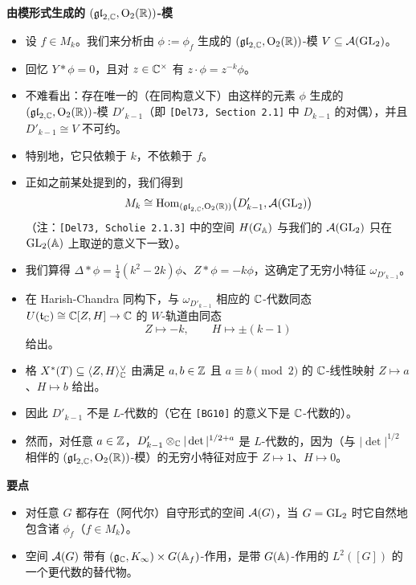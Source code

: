 \medskip
\noindent\textbf{由模形式生成的 $(\mathfrak{gl}_{2,\mathbb{C}},\mathrm{O}_2(\mathbb{R}))$-模}
\begin{itemize}
\item 设 $f\in M_k$。我们来分析由 $\phi:=\phi_f$ 生成的 $(\mathfrak{gl}_{2,\mathbb{C}},\mathrm{O}_2(\mathbb{R}))$-模 $V\subseteq\mathcal{A}(\operatorname{GL}_2)$。
\item 回忆 $Y*\phi=0$，且对 $z\in\mathbb{C}^\times$ 有 $z\cdot\phi=z^{-k}\phi$。
\item 不难看出：存在唯一的（在同构意义下）由这样的元素 $\phi$ 生成的 $(\mathfrak{gl}_{2,\mathbb{C}},\mathrm{O}_2(\mathbb{R}))$-模 $D'_{k-1}$（即 \texttt{[Del73, Section 2.1]} 中 $D_{k-1}$ 的对偶），并且 $D'_{k-1}\cong V$ 不可约。
\item 特别地，它只依赖于 $k$，不依赖于 $f$。
\item 正如之前某处提到的，我们得到
\[
M_k\cong\operatorname{Hom}_{(\mathfrak{gl}_{2,\mathbb{C}},\mathrm{O}_2(\mathbb{R}))}\bigl(D'_{k-1},\mathcal{A}(\operatorname{GL}_2)\bigr)
\]
（注：\texttt{[Del73, Scholie 2.1.3]} 中的空间 $H(G_{\mathbb{A}})$ 与我们的 $\mathcal{A}(\operatorname{GL}_2)$ 只在 $\operatorname{GL}_2(\mathbb{A})$ 上取逆的意义下一致）。
\item 我们算得 $\Delta*\phi=\tfrac14(k^2-2k)\phi$、$Z*\phi=-k\phi$，这确定了无穷小特征 $\omega_{D'_{k-1}}$。
\item 在 Harish-Chandra 同构下，与 $\omega_{D'_{k-1}}$ 相应的 $\mathbb{C}$-代数同态 $U(\mathfrak t_{\mathbb{C}})\cong\mathbb{C}[Z,H]\to\mathbb{C}$ 的 $W$-轨道由同态
\[
Z\longmapsto-k,\qquad H\longmapsto\pm(k-1)
\]
给出。
\item 格 $X^*(T)\subseteq\langle Z,H\rangle^\vee_{\mathbb{C}}$ 由满足 $a,b\in\mathbb{Z}$ 且 $a\equiv b\pmod2$ 的 $\mathbb{C}$-线性映射 $Z\mapsto a$、$H\mapsto b$ 给出。
\item 因此 $D'_{k-1}$ 不是 $L$-代数的（它在 \texttt{[BG10]} 的意义下是 $\mathbb{C}$-代数的）。
\item 然而，对任意 $a\in\mathbb{Z}$，$D'_{k-1}\otimes_{\mathbb{C}}|\det|^{1/2+a}$ 是 $L$-代数的，因为（与 $|\det|^{1/2}$ 相伴的 $(\mathfrak{gl}_{2,\mathbb{C}},\mathrm{O}_2(\mathbb{R}))$-模）的无穷小特征对应于 $Z\mapsto1$、$H\mapsto0$。
\end{itemize}

\medskip
\noindent\textbf{要点}
\begin{itemize}
\item 对任意 $G$ 都存在（阿代尔）自守形式的空间 $\mathcal{A}(G)$，当 $G=\operatorname{GL}_2$ 时它自然地包含诸 $\phi_f$（$f\in M_k$）。
\item 空间 $\mathcal{A}(G)$ 带有 $(\mathfrak{g}_{\mathbb{C}},K_\infty)\times G(\mathbb{A}_f)$-作用，是带 $G(\mathbb{A})$-作用的 $L^2([G])$ 的一个更代数的替代物。
\end{itemize}

